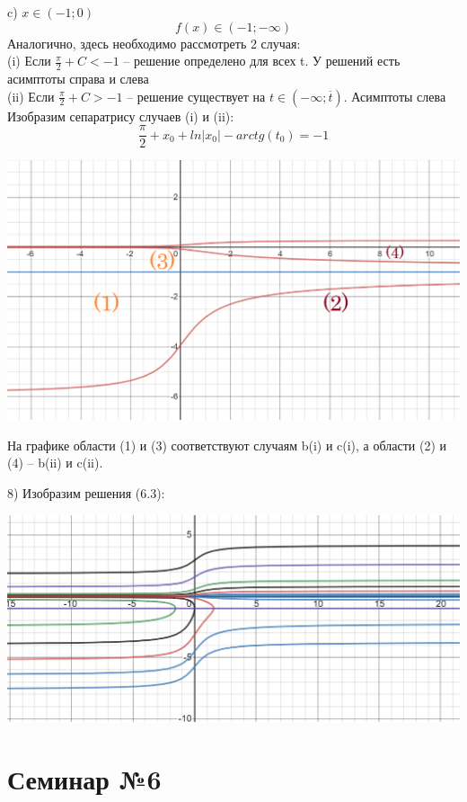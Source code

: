 \documentclass[10pt]{report}
\begin{document}
c)   $x \in (-1; 0)$
\[ f(x) \in (-1; -\infty)\]
Аналогично, здесь необходимо рассмотреть 2 случая:\\
(i) Если $ \frac \pi 2 + C < -1 $ -- решение определено для всех t. У решений есть асимптоты справа и слева\\
(ii) Если   $ \frac \pi 2 + C > -1 $ -- решение существует на $ t \in (-\infty; \overline{t})$. Асимптоты слева\\
Изобразим сепаратрису случаев (i) и (ii):
\[ \frac \pi 2 + x_0 +ln|x_0| - arctg(t_0) = -1 \]
\begin{center}
{\includegraphics[scale=0.4]{graph6.4.png}} 
\end{center}
На графике области (1) и (3) соответствуют случаям b(i) и c(i), а области (2) и (4) -- b(ii) и c(ii).

8) Изобразим решения (6.3):
\begin{center}
{\includegraphics[scale=0.55]{graph6.5.png}} 
\end{center}

\chapter[{Семинар №6}]{Семинар №6}
\thispagestyle{empty}
\end{document}
